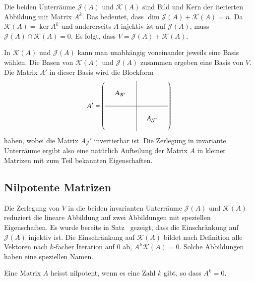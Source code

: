 Die beiden Unterräume $\mathcal{J}(A)$ und $\mathcal{K}(A)$
sind Bild und Kern der iterierten Abbildung mit Matrix $A^k$.
Das bedeutet, dass $\dim\mathcal{J}(A)+\mathcal{K}(A)=n$.
Da $\mathcal{K}(A)=\ker A^k$ und andererseits $A$ injektiv ist auf
$\mathcal{J}(A)$, muss $\mathcal{J}(A)\cap\mathcal{K}(A)=0$.
Es folgt, dass $V=\mathcal{J}(A) + \mathcal{K}(A)$.

In $\mathcal{K}(A)$ und $\mathcal{J}(A)$ kann man unabhängig voneinander
jeweils eine Basis wählen.
Die Basen von $\mathcal{K}(A)$ und $\mathcal{J}(A)$ zusammen ergeben
eine Basis von $V$.
Die Matrix $A'$ in dieser Basis wird die Blockform
\[
A'
=
\left(
\begin{array}{ccc|ccc}
&&&&&\\
&A_{\mathcal{K}'}&&&&\\
&&&&&\\
\hline
&&&&&\\
&&&&A_{\mathcal{J}'}&\\
&&&&&\\
\end{array}
\right)
\]
haben, wobei die Matrix $A_\mathcal{J}'$ invertierbar ist.
Die Zerlegung in invariante Unterräume ergibt also eine natürlich
Aufteilung der Matrix $A$ in kleiner Matrizen mit zum Teil bekannten
Eigenschaften.

%
%
\subsection{Nilpotente Matrizen
\label{buch:subsection:nilpotente-matrizen}}
Die Zerlegung von $V$ in die beiden invarianten Unterräume $\mathcal{J}(A)$
und $\mathcal{K}(A)$ reduziert die lineare Abbildung auf zwei Abbildungen
mit speziellen Eigenschaften.
Es wurde bereits in Satz~\label{buch:eigenwerte:satz:fJinj} gezeigt,
dass die Einschränkung auf $\mathcal{J}(A)$ injektiv ist.
Die Einschränkung auf $\mathcal{K}(A)$ bildet nach Definition alle
Vektoren nach $k$-facher Iteration auf $0$ ab, $A^k\mathcal{K}(A)=0$.
Solche Abbildungen haben eine speziellen Namen.

\begin{definition}
\label{buch:eigenwerte:def:nilpotent}
Eine Matrix $A$ heisst nilpotent, wenn es eine Zahl $k$ gibt, so dass
$A^k=0$.
\end{definition}

